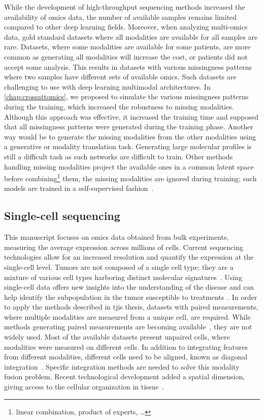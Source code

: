 \documentclass[../main.tex]{subfiles}
\begin{document}
		While the development of high-throughput sequencing methods increased the availability of omics data, the number of available samples remains limited compared to other deep learning fields.
		Moreover, when analyzing multi-omics data, gold standard datasets where all modalities are available for all samples are rare.
		Datasets, where some modalities are available for some patients, are more common as generating all modalities will increase the cost, or patients did not accept some analysis.
		This results in datasets with various missingness patterns where two samples have different sets of available omics.
		Such datasets are challenging to use with deep learning multimodal architectures.
		In \cref{chap:crossattomics}, we proposed to simulate the various missingness patterns during the training, which increased the robustness to missing modalities.
		Although this approach was effective, it increased the training time and supposed that all missingness patterns were generated during the training phase.
		Another way would be to generate the missing modalities from the other modalities using a generative or modality translation task.
		Generating large molecular profiles is still a difficult task as such networks are difficult to train.
		Other methods handling missing modalities project the available ones in a common latent space before combining\footnote{linear combination, product of experts, \dots} them, the missing modalities are ignored during training; such models are trained in a self-supervised fashion~\cite{Lee2021AVI}.

	\subsection{Single-cell sequencing}
		This manuscript focuses on omics data obtained from bulk experiments, measuring the average expression across millions of cells.
		Current sequencing technologies allow for an increased resolution and quantify the expression at the single-cell level.
		Tumors are not composed of a single cell type; they are a mixture of various cell types harboring distinct molecular signatures~\cite{TumourHetero}.
		Using single-cell data offers new insights into the understanding of the disease and can help identify the subpopulation in the tumor susceptible to treatments~\cite{DagogoJack2017}.
		In order to apply the methods described in tjis thesis, datasets with paired measurements, where multiple modalities are measured from a unique cell, are required.
		While methods generating paired measurements are becoming available~\cite{Macaulay2015,Hao2021,Vandereyken2023}, they are not widely used.
		Most of the available datasets present unpaired cells, where modalities were measured on different cells.
		In addition to integrating features from different modalities, different cells need to be aligned, known as diagonal integration~\cite{Xu2022}.
		Specific integration methods are needed to solve this modality fusion problem.
		Recent technological development added a spatial dimension, giving access to the cellular organization in tissue~\cite{Vandereyken2023}.
\end{document}
